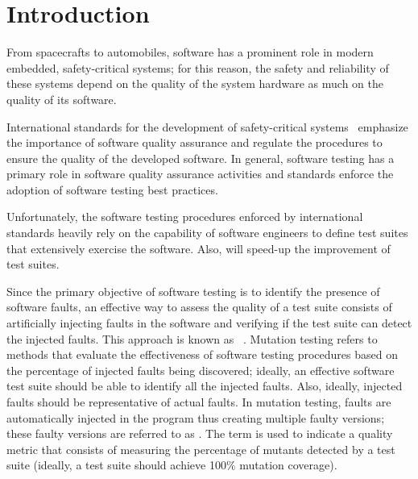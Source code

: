 
\chapter*{Introduction}
\label{sec:introduction}

From spacecrafts to automobiles, software has a prominent role in modern embedded, safety-critical systems; for this reason, the safety and reliability of these systems 
depend on the quality of the system hardware as much on the quality of its software.

International standards for the development of safety-critical systems~\cite{ecss40C,ecss80C,ISO26262} emphasize the importance of software quality assurance and regulate the procedures to ensure the quality of the developed software. In general, software testing has a primary role in software quality assurance activities and standards enforce the adoption of software testing best practices.

Unfortunately, the software testing procedures enforced by international standards heavily rely on the capability of software engineers to define test suites that extensively exercise the software.  
Also,  will speed-up the improvement of test suites. 

Since the primary objective of software testing is to identify the presence of software faults, an effective way to assess the quality of a test suite consists of artificially injecting faults in the software and verifying if the test suite can detect the injected faults. 
This approach is known as ~\cite{DeMillo78}. Mutation testing refers to methods that evaluate the effectiveness of software testing procedures based on the percentage of injected faults being discovered; ideally, an effective software test suite should be able to identify all the injected faults. Also, ideally, injected faults should be representative of actual faults. 
In mutation testing, faults are automatically injected in the program thus creating multiple faulty versions; these faulty versions are referred to as .  The term  is used to indicate a quality metric that consists of measuring the percentage of mutants detected by a test suite (ideally, a test suite should achieve 100\% mutation coverage). 

